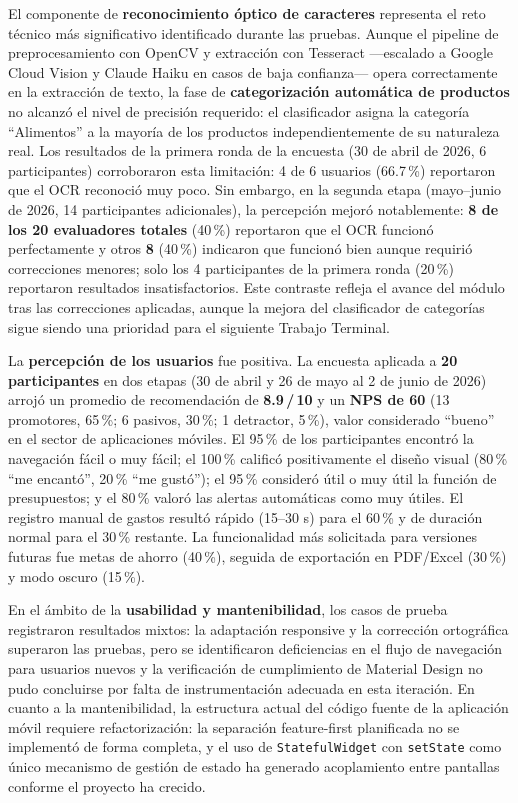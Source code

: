 El componente de \textbf{reconocimiento óptico de caracteres} representa el reto técnico más significativo identificado durante las pruebas. Aunque el pipeline de preprocesamiento con OpenCV y extracción con Tesseract ---escalado a Google Cloud Vision y Claude Haiku en casos de baja confianza--- opera correctamente en la extracción de texto, la fase de \textbf{categorización automática de productos} no alcanzó el nivel de precisión requerido: el clasificador asigna la categoría ``Alimentos'' a la mayoría de los productos independientemente de su naturaleza real. Los resultados de la primera ronda de la encuesta (30 de abril de 2026, 6 participantes) corroboraron esta limitación: 4 de 6 usuarios (66.7\,\%) reportaron que el OCR reconoció muy poco. Sin embargo, en la segunda etapa (mayo--junio de 2026, 14 participantes adicionales), la percepción mejoró notablemente: \textbf{8 de los 20 evaluadores totales} (40\,\%) reportaron que el OCR funcionó perfectamente y otros \textbf{8} (40\,\%) indicaron que funcionó bien aunque requirió correcciones menores; solo los 4 participantes de la primera ronda (20\,\%) reportaron resultados insatisfactorios. Este contraste refleja el avance del módulo tras las correcciones aplicadas, aunque la mejora del clasificador de categorías sigue siendo una prioridad para el siguiente Trabajo Terminal.

\bigskip

La \textbf{percepción de los usuarios} fue positiva. La encuesta aplicada a \textbf{20 participantes} en dos etapas (30 de abril y 26 de mayo al 2 de junio de 2026) arrojó un promedio de recomendación de \textbf{8.9\,/\,10} y un \textbf{NPS de 60} (13 promotores, 65\,\%; 6 pasivos, 30\,\%; 1 detractor, 5\,\%), valor considerado ``bueno'' en el sector de aplicaciones móviles. El 95\,\% de los participantes encontró la navegación fácil o muy fácil; el 100\,\% calificó positivamente el diseño visual (80\,\% ``me encantó'', 20\,\% ``me gustó''); el 95\,\% consideró útil o muy útil la función de presupuestos; y el 80\,\% valoró las alertas automáticas como muy útiles. El registro manual de gastos resultó rápido (15--30 s) para el 60\,\% y de duración normal para el 30\,\% restante. La funcionalidad más solicitada para versiones futuras fue metas de ahorro (40\,\%), seguida de exportación en PDF/Excel (30\,\%) y modo oscuro (15\,\%).

\bigskip

En el ámbito de la \textbf{usabilidad y mantenibilidad}, los casos de prueba registraron resultados mixtos: la adaptación responsive y la corrección ortográfica superaron las pruebas, pero se identificaron deficiencias en el flujo de navegación para usuarios nuevos y la verificación de cumplimiento de Material Design no pudo concluirse por falta de instrumentación adecuada en esta iteración. En cuanto a la mantenibilidad, la estructura actual del código fuente de la aplicación móvil requiere refactorización: la separación feature-first planificada no se implementó de forma completa, y el uso de \texttt{StatefulWidget} con \texttt{setState} como único mecanismo de gestión de estado ha generado acoplamiento entre pantallas conforme el proyecto ha crecido.


